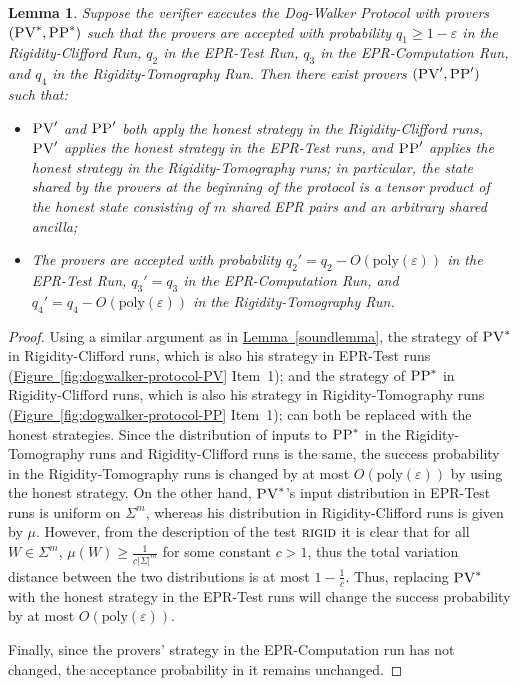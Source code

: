 \documentclass[11pt]{article}
\numberwithin{equation}{section}
\newtheorem{lemma}[theorem]{Lemma}
\theoremstyle{definition}
\theoremstyle{plain}
\newcommand{\expref}[2]{\hyperref[#2]{#1~\ref{#2}}}
\newcommand{\eps}{\varepsilon}
\newcommand{\rigid}{\textsc{rigid}}
\newcommand{\pv}{\textsc{PV}}
\newcommand{\pp}{\textsc{PP}}
\begin{document}
\begin{lemma}\label{lem:PV-2-PP-4}
Suppose the verifier executes the Dog-Walker Protocol 
with provers $(\pv^*,\pp^*)$ such that the provers are accepted with probability $q_1\geq 1-\eps$ in the Rigidity-Clifford Run, $q_2$ in the EPR-Test Run, $q_3$ in the EPR-Computation Run, and $q_4$ in the Rigidity-Tomography Run. Then there exist provers $(\pv',\pp')$ such that:
\begin{itemize}[nolistsep]
\item $\pv'$ and $\pp'$ both apply the honest strategy in the Rigidity-Clifford runs, $\pv'$ applies the honest strategy in the EPR-Test runs, and $\pp'$ applies the honest strategy in the Rigidity-Tomography runs; in particular, the state shared by the provers at the beginning of the protocol is a tensor product of the honest state consisting of $m$ shared EPR pairs and an arbitrary shared ancilla;
\item The provers are accepted with probability $q_2'=q_2-O(\mathrm{poly}(\eps))$ in the EPR-Test Run, $q_3'=q_3$ in the EPR-Computation Run, and $q_4'=q_4-O(\mathrm{poly}(\eps))$ in the Rigidity-Tomography Run. 
\end{itemize}
\end{lemma}

\begin{proof}
Using a similar argument as in \expref{Lemma}{soundlemma}, the strategy of $\pv^*$ in
Rigidity-Clifford runs, which is also his strategy in EPR-Test runs (\expref{Figure}{fig:dogwalker-protocol-PV} Item~1); and the strategy of $\pp^*$ in Rigidity-Clifford runs, which is also his strategy in Rigidity-Tomography runs (\expref{Figure}{fig:dogwalker-protocol-PP} Item~1);
 can both be replaced with the honest strategies. Since the distribution of inputs to $\pp^*$ in the Rigidity-Tomography runs and Rigidity-Clifford runs is the same, the success probability in the Rigidity-Tomography runs is changed by at most $O(\mathrm{poly}(\eps))$ by using the honest strategy. 
On the other hand, $\pv^*$'s input distribution in EPR-Test runs is uniform on $\Sigma^m$, whereas his distribution in Rigidity-Clifford runs is given by $\mu$. However, from the description of the test $\rigid$ it is clear that for all $W\in\Sigma^m$, $\mu(W)\geq \frac{1}{c|\Sigma|^m}$ for some constant $c>1$, thus the total variation distance between the two distributions is at most $1-\frac{1}{c}$. Thus, replacing $\pv^*$ with the honest strategy in the EPR-Test  runs will change the success probability by at most  $O(\mathrm{poly}(\eps))$. 

Finally, since the provers' strategy in the EPR-Computation run has not changed, the
  acceptance probability in it remains unchanged.
\end{proof}
\end{document}
